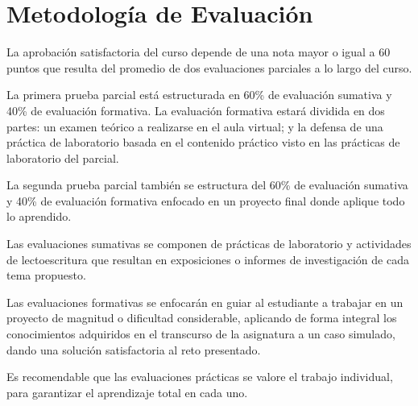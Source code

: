 \section{Metodología de Evaluación}

La aprobación satisfactoria del curso depende de una nota mayor o igual a 60 puntos que resulta del promedio de dos evaluaciones parciales a lo largo del curso.

La primera prueba parcial está estructurada en 60\% de evaluación sumativa y 40\% de evaluación formativa. La evaluación formativa estará dividida en dos partes: un examen teórico a realizarse en el aula virtual; y la defensa de una práctica de laboratorio basada en el contenido práctico visto en las prácticas de laboratorio del parcial.

La segunda prueba parcial también se estructura del 60\% de evaluación sumativa y 40\% de evaluación formativa enfocado en un proyecto final donde aplique todo lo aprendido.

Las evaluaciones sumativas se componen de prácticas de laboratorio y actividades de lectoescritura que resultan en exposiciones o informes de investigación de cada tema propuesto.

Las evaluaciones formativas se enfocarán en guiar al estudiante a trabajar en un proyecto de magnitud o dificultad considerable, aplicando de forma integral los conocimientos adquiridos en el transcurso de la asignatura a un caso simulado, dando una solución satisfactoria al reto presentado.

Es recomendable que las evaluaciones prácticas se valore el trabajo individual, para garantizar el aprendizaje total en cada uno.
\pagebreak
